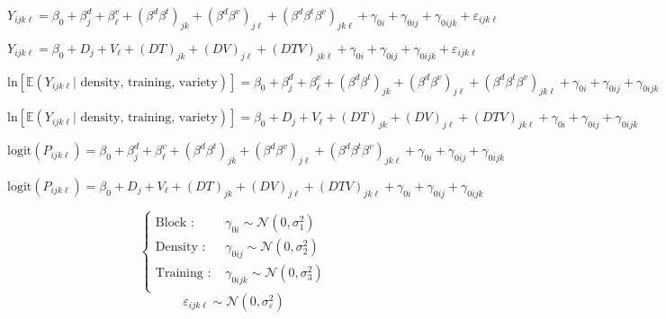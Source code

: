 \documentclass[a4paper, landscape, 11pt]{article}
\title{}
\author{}
\date{}
\begin{document}
\LARGE
\[
Y_{ijk\ell} = \beta_0 + \beta_j^d + \beta_{\ell}^v + \left( \beta^d\beta^t \right)_{jk} + \left( \beta^d\beta^v \right)_{j\ell} + \left( \beta^d\beta^t\beta^v \right)_{jk\ell} +\gamma_{0i} + \gamma_{0ij} + \gamma_{0ijk}  + \varepsilon_{ijk\ell}
\]

\newpage

\[
Y_{ijk\ell} = \beta_0 + D_j + V_\ell + \left( DT \right)_{jk} + \left( DV \right)_{j\ell} + \left( DTV \right)_{jk\ell} +\gamma_{0i} + \gamma_{0ij} + \gamma_{0ijk}  + \varepsilon_{ijk\ell}
\]

\newpage

\[
\text{ln}\left[\mathbb{E}\left( Y_{ijk\ell} | \text{ density, training, variety} \right) \right] = \beta_0 + \beta_j^d + \beta_{\ell}^v + \left( \beta^d\beta^t \right)_{jk} + \left( \beta^d\beta^v \right)_{j\ell} + \left( \beta^d\beta^t\beta^v \right)_{jk\ell} +\gamma_{0i} + \gamma_{0ij} + \gamma_{0ijk} 
\]

\newpage

\[
\text{ln}\left[\mathbb{E}\left( Y_{ijk\ell} | \text{ density, training, variety} \right) \right] = \beta_0 + D_j + V_\ell + \left( DT \right)_{jk} + \left( DV \right)_{j\ell} + \left( DTV \right)_{jk\ell}+\gamma_{0i} + \gamma_{0ij} + \gamma_{0ijk} 
\]

\newpage

\[
\text{logit}\left( P_{ijk\ell} \right) = \beta_0 + \beta_j^d + \beta_{\ell}^v + \left( \beta^d\beta^t \right)_{jk} + \left( \beta^d\beta^v \right)_{j\ell} + \left( \beta^d\beta^t\beta^v \right)_{jk\ell}+\gamma_{0i} + \gamma_{0ij} + \gamma_{0ijk} 
\]


\newpage

\[
\text{logit}\left( P_{ijk\ell} \right) = \beta_0 + D_j + V_\ell + \left( DT \right)_{jk} + \left( DV \right)_{j\ell} + \left( DTV \right)_{jk\ell}+\gamma_{0i} + \gamma_{0ij} + \gamma_{0ijk} 
\]

\newpage

\[
\begin{cases}
 \text{Block : } & \gamma_{0i} \sim \mathcal{N}\left( 0, \sigma_1^2 \right)\\
 \text{Density : } & \gamma_{0ij} \sim \mathcal{N}\left( 0, \sigma_2^2 \right)\\
 \text{Training : } & \gamma_{0ijk} \sim \mathcal{N}\left( 0, \sigma_3^2 \right)\\
\end{cases}
\]
\vspace{3cm}
\[
\varepsilon_{ijk\ell} \sim \mathcal{N}\left( 0, \sigma^2_\varepsilon \right)
\]
\end{document}
